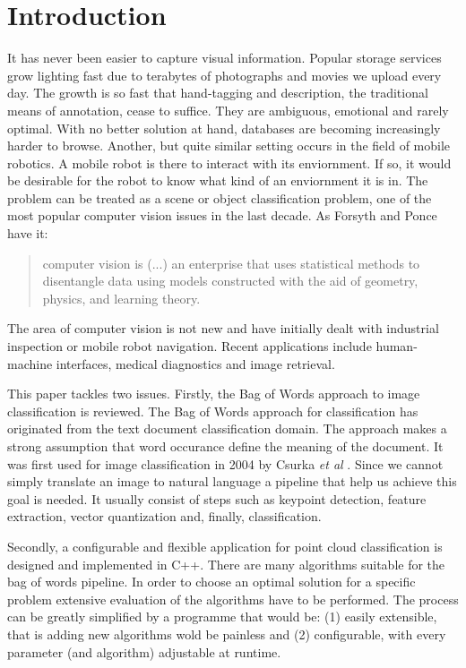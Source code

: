 \chapter{Introduction}

	It has never been easier to capture visual information. Popular storage services grow lighting fast due to terabytes of photographs and movies we upload every day. The growth is so fast that hand-tagging and description, the traditional means of annotation, cease to suffice. They are ambiguous, emotional and rarely optimal. With no better solution at hand, databases are becoming increasingly harder to browse. Another, but quite similar setting occurs in the field of mobile robotics. A mobile robot is there to interact with its enviornment. If so, it would be desirable for the robot to know what kind of an enviornment it is in. The problem can be treated as a scene or object classification problem, one of the most popular computer vision issues in the last decade. As Forsyth and Ponce \cite{ponce2011cv} have it:	
	
	\begin{quote} 
		computer vision is (...) an enterprise that uses statistical methods to disentangle data using models constructed with the aid of geometry, physics, and learning theory.
	\end{quote} 
	
	The area of computer vision is not new and have initially dealt with industrial inspection or mobile robot navigation. Recent applications include human-machine interfaces, medical diagnostics and image retrieval.
	
	This paper tackles two issues. Firstly, the Bag of Words approach to image classification is reviewed. The Bag of Words approach for classification has originated from the text document classification domain. The approach makes a strong assumption that word occurance define the meaning of the document. It was first used for image classification in 2004 by Csurka \textit{et al} \cite{csurka2004visual}. Since we cannot simply translate an image to natural language a pipeline that help us achieve this goal is needed. It usually consist of steps such as keypoint detection, feature extraction, vector quantization and, finally, classification.
	
	Secondly, a configurable and flexible application for point cloud classification is designed and implemented in C++. There are many algorithms suitable for the bag of words pipeline. In order to choose an optimal solution for a specific problem extensive evaluation of the algorithms have to be performed. The process can be greatly simplified by a programme that would be: (1) easily extensible, that is adding new algorithms wold be painless and (2) configurable, with every parameter (and algorithm) adjustable at runtime.
	
